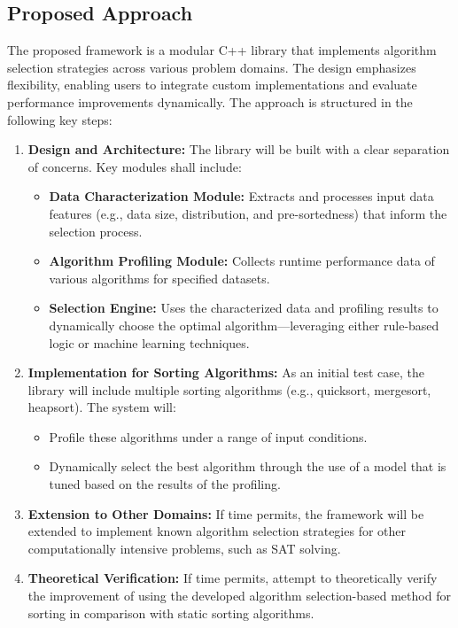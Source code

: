 \documentclass[twocolumn]{article}
\begin{document}
\subsection*{Proposed Approach}

The proposed framework is a modular C++ library that implements algorithm selection strategies across various problem domains. The design emphasizes flexibility, enabling users to integrate custom implementations and evaluate performance improvements dynamically. The approach is structured in the following key steps:

\begin{enumerate}
    \item \textbf{Design and Architecture:}  
    The library will be built with a clear separation of concerns. Key modules shall include:
    \begin{itemize}
        \item \textbf{Data Characterization Module:} Extracts and processes input data features (e.g., data size, distribution, and pre-sortedness) that inform the selection process.
        \item \textbf{Algorithm Profiling Module:} Collects runtime performance data of various algorithms for specified datasets.
        \item \textbf{Selection Engine:} Uses the characterized data and profiling results to dynamically choose the optimal algorithm—leveraging either rule-based logic or machine learning techniques.
    \end{itemize}
    
    \item \textbf{Implementation for Sorting Algorithms:}  
    As an initial test case, the library will include multiple sorting algorithms (e.g., quicksort, mergesort, heapsort). The system will:
    \begin{itemize}
        \item Profile these algorithms under a range of input conditions.
        \item Dynamically select the best algorithm through the use of a model that is tuned based on the results of the profiling.
    \end{itemize}
    
    \item \textbf{Extension to Other Domains:}  
    If time permits, the framework will be extended to implement known algorithm selection strategies for other computationally intensive problems, such as SAT solving. 
    
    \item \textbf{Theoretical Verification:} 
    If time permits, attempt to theoretically verify the improvement of using the developed algorithm selection-based method for sorting in comparison with static sorting algorithms.
\end{enumerate}
\end{document}
